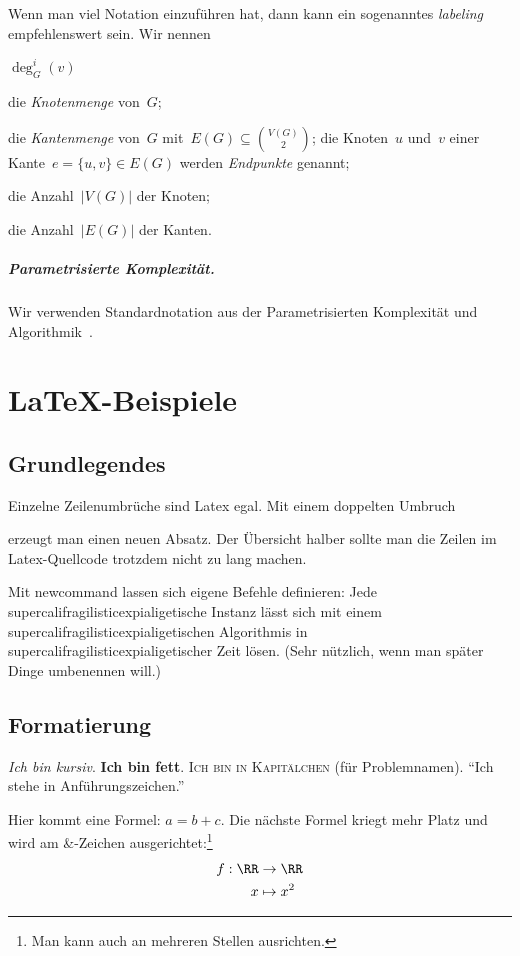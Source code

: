 Wenn man viel Notation einzuführen hat, dann kann ein sogenanntes \emph{labeling} empfehlenswert sein.
Wir nennen
\begin{labeling}{$\deg^i_G(v)$}
	\item[$V(G)$] die \emph{Knotenmenge} von~$G$;
	\item[$E(G)$] die \emph{Kantenmenge} von~$G$ mit~$E(G) \subseteq \binom{V(G)}{2}$; die Knoten~$u$ und~$v$ einer Kante~$e = \{u, v\} \in E(G)$ werden \emph{Endpunkte} genannt;
	\item[$n_G$] die Anzahl~$|V(G)|$ der Knoten;
	\item[$m_G$] die Anzahl~$|E(G)|$ der Kanten.
\end{labeling}

\paragraph*{Parametrisierte Komplexität.} 
Wir verwenden Standardnotation aus der Parametrisierten Komplexität und Algorithmik~\cite{Nie06}.

\chapter{\LaTeX{}-Beispiele}

\section{Grundlegendes}
Einzelne Zeilenumbrüche
sind 
Latex egal.
Mit einem doppelten Umbruch

erzeugt man einen neuen Absatz.
Der Übersicht halber sollte man die Zeilen im Latex-Quellcode trotzdem nicht zu lang machen.

Mit newcommand lassen sich eigene Befehle definieren:
\newcommand{\sfe}{supercalifragilisticexpialigetisch}
Jede \sfe{}e Instanz lässt sich mit einem \sfe{}en Algorithmis in \sfe{}er Zeit lösen.
(Sehr nützlich, wenn man später Dinge umbenennen will.)

\section{Formatierung}
\textit{Ich bin kursiv}.
\textbf{Ich bin fett}.
\textsc{Ich bin in Kapitälchen} (für Problemnamen).
\enquote{Ich stehe in Anführungszeichen.}

Hier kommt eine Formel: $a = b + c$.
Die nächste Formel kriegt mehr Platz und wird am \&-Zeichen ausgerichtet:\footnote{Man kann auch an mehreren Stellen ausrichten.}
\begin{align*}
	f : \RR &\to \RR \\
	x &\mapsto x^2
\end{align*}

